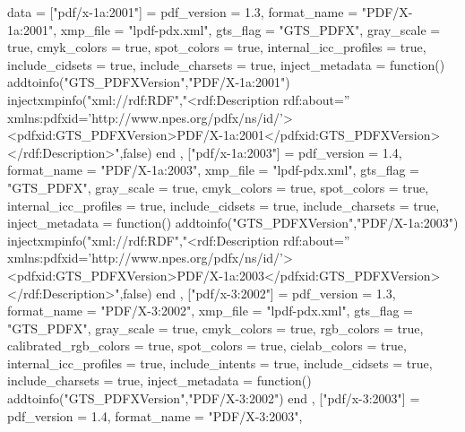data = {
        ["pdf/x-1a:2001"] = {
            pdf_version             = 1.3,
            format_name             = "PDF/X-1a:2001",
            xmp_file                = "lpdf-pdx.xml",
            gts_flag                = "GTS_PDFX",
            gray_scale              = true,
            cmyk_colors             = true,
            spot_colors             = true,
            internal_icc_profiles   = true,
            include_cidsets         = true,
            include_charsets        = true,
            inject_metadata         = function()
                addtoinfo("GTS_PDFXVersion","PDF/X-1a:2001")
                injectxmpinfo("xml://rdf:RDF","<rdf:Description rdf:about='' xmlns:pdfxid='http://www.npes.org/pdfx/ns/id/'><pdfxid:GTS_PDFXVersion>PDF/X-1a:2001</pdfxid:GTS_PDFXVersion></rdf:Description>",false)
            end
        },
        ["pdf/x-1a:2003"] = {
            pdf_version             = 1.4,
            format_name             = "PDF/X-1a:2003",
            xmp_file                = "lpdf-pdx.xml",
            gts_flag                = "GTS_PDFX",
            gray_scale              = true,
            cmyk_colors             = true,
            spot_colors             = true,
            internal_icc_profiles   = true,
            include_cidsets         = true,
            include_charsets        = true,
            inject_metadata         = function()
                addtoinfo("GTS_PDFXVersion","PDF/X-1a:2003")
                injectxmpinfo("xml://rdf:RDF","<rdf:Description rdf:about='' xmlns:pdfxid='http://www.npes.org/pdfx/ns/id/'><pdfxid:GTS_PDFXVersion>PDF/X-1a:2003</pdfxid:GTS_PDFXVersion></rdf:Description>",false)
            end
        },
        ["pdf/x-3:2002"] = {
            pdf_version             = 1.3,
            format_name             = "PDF/X-3:2002",
            xmp_file                = "lpdf-pdx.xml",
            gts_flag                = "GTS_PDFX",
            gray_scale              = true,
            cmyk_colors             = true,
            rgb_colors              = true,
            calibrated_rgb_colors   = true,
            spot_colors             = true,
            cielab_colors           = true,
            internal_icc_profiles   = true,
            include_intents         = true,
            include_cidsets         = true,
            include_charsets        = true,
            inject_metadata         = function()
                addtoinfo("GTS_PDFXVersion","PDF/X-3:2002")
            end
        },
        ["pdf/x-3:2003"] = {
            pdf_version             = 1.4,
            format_name             = "PDF/X-3:2003",
}}
